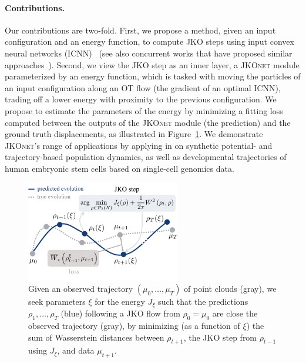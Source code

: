 
\paragraph{Contributions.}\hspace{1em} Our contributions are two-fold. First, we propose a method, given an input configuration and an energy function, to compute JKO steps using input convex neural networks (ICNN)~\citep{amos2017input,makkuva2020optimal} (see also concurrent works that have proposed similar approaches~\citep{alvarez2021optimizing, mokrov2021large}). Second, we view the JKO step as an inner layer, a \textsc{JKOnet} module parameterized by an energy function, which is tasked with moving the particles of an input configuration along an OT flow (the gradient of an optimal ICNN), trading off a lower energy with proximity to the previous configuration.
We propose to estimate the parameters of the energy by minimizing a fitting loss %
computed between the outputs of the \textsc{JKOnet} module (the prediction) and the ground truth displacements, as illustrated in Figure~\ref{fig:overview_jkonet}.
We demonstrate \textsc{JKOnet}'s range of applications by applying in on synthetic potential- and trajectory-based population dynamics, as well as developmental trajectories of human embryonic stem cells based on single-cell genomics data.

\begin{figure}[t]
    \centering
    \includegraphics[width=0.6\textwidth]{figures/fig_overview_jkonet.pdf}
    \caption{Given an observed trajectory $(\mu_0,\dots,\mu_T)$ of point clouds (gray), we seek parameters $\xi$ for the energy $J_\xi$ such that the predictions $\rho_1, \dots, \rho_T$ (blue) following a JKO flow from $\rho_0=\mu_0$ are close the observed trajectory (gray), by minimizing (as a function of $\xi$) the sum of Wasserstein distances between $\rho_{t+1}$, the JKO step from $\rho_{t-1}$ using $J_\xi$, and data $\mu_{t+1}$.}
    \label{fig:overview_jkonet}
\end{figure}


